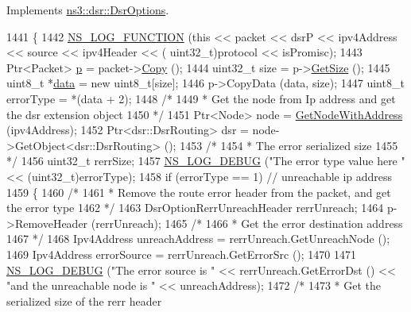 Implements \hyperlink{classns3_1_1dsr_1_1DsrOptions_ac34fb87a95464f3ea9d82ad12253a5cc}{ns3\+::dsr\+::\+Dsr\+Options}.


\begin{DoxyCode}
1441 \{
1442   \hyperlink{log-macros-disabled_8h_a90b90d5bad1f39cb1b64923ea94c0761}{NS\_LOG\_FUNCTION} (\textcolor{keyword}{this} << packet << dsrP << ipv4Address << source << ipv4Header << (
      uint32\_t)protocol << isPromisc);
1443   Ptr<Packet> \hyperlink{lte__link__budget_8m_ac9de518908a968428863f829398a4e62}{p} = packet->\hyperlink{classns3_1_1Packet_a5d5c70802a5f77fc5f0001e0cfc1898b}{Copy} ();
1444   uint32\_t size = p->\hyperlink{classns3_1_1Packet_a462855c9929954d4301a4edfe55f4f1c}{GetSize} ();
1445   uint8\_t *\hyperlink{topology-example-sim_8cc_a26c65296e316af77b787dc77469bb2a4}{data} = \textcolor{keyword}{new} uint8\_t[size];
1446   p->CopyData (data, size);
1447   uint8\_t errorType = *(data + 2);
1448   \textcolor{comment}{/*}
1449 \textcolor{comment}{   * Get the node from Ip address and get the dsr extension object}
1450 \textcolor{comment}{   */}
1451   Ptr<Node> node = \hyperlink{classns3_1_1dsr_1_1DsrOptions_a1a91f820f3d754a477a54bad547ca659}{GetNodeWithAddress} (ipv4Address);
1452   Ptr<dsr::DsrRouting> dsr = node->GetObject<dsr::DsrRouting> ();
1453   \textcolor{comment}{/*}
1454 \textcolor{comment}{   * The error serialized size}
1455 \textcolor{comment}{   */}
1456   uint32\_t rerrSize;
1457   \hyperlink{group__logging_ga413f1886406d49f59a6a0a89b77b4d0a}{NS\_LOG\_DEBUG} (\textcolor{stringliteral}{"The error type value here "} << (uint32\_t)errorType);
1458   \textcolor{keywordflow}{if} (errorType == 1) \textcolor{comment}{// unreachable ip address}
1459     \{
1460       \textcolor{comment}{/*}
1461 \textcolor{comment}{       * Remove the route error header from the packet, and get the error type}
1462 \textcolor{comment}{       */}
1463       DsrOptionRerrUnreachHeader rerrUnreach;
1464       p->RemoveHeader (rerrUnreach);
1465       \textcolor{comment}{/*}
1466 \textcolor{comment}{       * Get the error destination address}
1467 \textcolor{comment}{       */}
1468       Ipv4Address unreachAddress = rerrUnreach.GetUnreachNode ();
1469       Ipv4Address errorSource = rerrUnreach.GetErrorSrc ();
1470 
1471       \hyperlink{group__logging_ga413f1886406d49f59a6a0a89b77b4d0a}{NS\_LOG\_DEBUG} (\textcolor{stringliteral}{"The error source is "} <<  rerrUnreach.GetErrorDst () << \textcolor{stringliteral}{"and the
       unreachable node is "} << unreachAddress);
1472       \textcolor{comment}{/*}
1473 \textcolor{comment}{       * Get the serialized size of the rerr header}

\end{DoxyCode}
